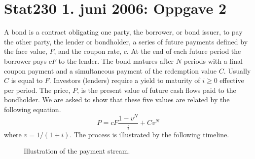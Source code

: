 \documentclass[a4paper,colorinlistoftodos, 10pt]{article}
\begin{document}
\section*{Stat230 1. juni 2006: Oppgave 2}

A bond is a contract obligating one party, the borrower, or bond issuer, to pay the other party, the lender or bondholder, a series of future payments defined by the face value, $F$, and the coupon rate, $c$. At the end of each future period the borrower pays $cF$ to the lender. The bond matures after $N$ periods with a final coupon payment and a simultaneous payment of the redemption value $C$. Usually $C$ is equal to $F$. Investors (lenders) require a yield to maturity of $i\geq 0$ effective per period. The price, $P$, is the present value of future cash flows paid to the bondholder. We are asked to show that these five values are related by the following equation.
\begin{equation*}
    P = cF\frac{1-v^N}{i} + Cv^N
\end{equation*}
where $v = 1/(1+i)$. The process is illustrated by the following timeline.

\begin{figure}[ht]
\centering
{}
\caption{Illustration of the payment stream.}
\end{figure}
\end{document}

